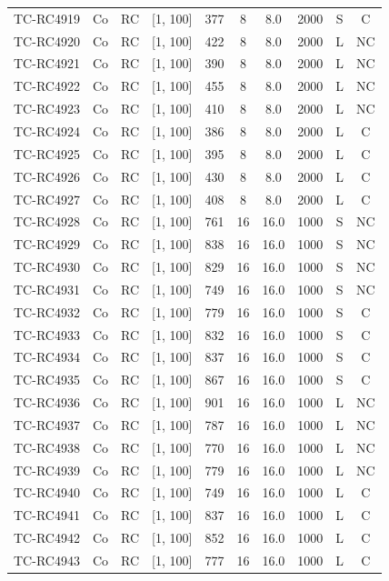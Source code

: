 \begin{longtable}{lccccccccc}
TC-RC4919 & Co & RC & [1, 100] & 377 & 8 & 8.0 & 2000 & S & C \\
TC-RC4920 & Co & RC & [1, 100] & 422 & 8 & 8.0 & 2000 & L & NC \\
TC-RC4921 & Co & RC & [1, 100] & 390 & 8 & 8.0 & 2000 & L & NC \\
TC-RC4922 & Co & RC & [1, 100] & 455 & 8 & 8.0 & 2000 & L & NC \\
TC-RC4923 & Co & RC & [1, 100] & 410 & 8 & 8.0 & 2000 & L & NC \\
TC-RC4924 & Co & RC & [1, 100] & 386 & 8 & 8.0 & 2000 & L & C \\
TC-RC4925 & Co & RC & [1, 100] & 395 & 8 & 8.0 & 2000 & L & C \\
TC-RC4926 & Co & RC & [1, 100] & 430 & 8 & 8.0 & 2000 & L & C \\
TC-RC4927 & Co & RC & [1, 100] & 408 & 8 & 8.0 & 2000 & L & C \\
TC-RC4928 & Co & RC & [1, 100] & 761 & 16 & 16.0 & 1000 & S & NC \\
TC-RC4929 & Co & RC & [1, 100] & 838 & 16 & 16.0 & 1000 & S & NC \\
TC-RC4930 & Co & RC & [1, 100] & 829 & 16 & 16.0 & 1000 & S & NC \\
TC-RC4931 & Co & RC & [1, 100] & 749 & 16 & 16.0 & 1000 & S & NC \\
TC-RC4932 & Co & RC & [1, 100] & 779 & 16 & 16.0 & 1000 & S & C \\
TC-RC4933 & Co & RC & [1, 100] & 832 & 16 & 16.0 & 1000 & S & C \\
TC-RC4934 & Co & RC & [1, 100] & 837 & 16 & 16.0 & 1000 & S & C \\
TC-RC4935 & Co & RC & [1, 100] & 867 & 16 & 16.0 & 1000 & S & C \\
TC-RC4936 & Co & RC & [1, 100] & 901 & 16 & 16.0 & 1000 & L & NC \\
TC-RC4937 & Co & RC & [1, 100] & 787 & 16 & 16.0 & 1000 & L & NC \\
TC-RC4938 & Co & RC & [1, 100] & 770 & 16 & 16.0 & 1000 & L & NC \\
TC-RC4939 & Co & RC & [1, 100] & 779 & 16 & 16.0 & 1000 & L & NC \\
TC-RC4940 & Co & RC & [1, 100] & 749 & 16 & 16.0 & 1000 & L & C \\
TC-RC4941 & Co & RC & [1, 100] & 837 & 16 & 16.0 & 1000 & L & C \\
TC-RC4942 & Co & RC & [1, 100] & 852 & 16 & 16.0 & 1000 & L & C \\
TC-RC4943 & Co & RC & [1, 100] & 777 & 16 & 16.0 & 1000 & L & C \\

\end{longtable}
